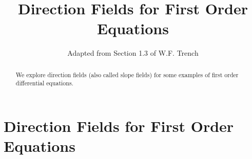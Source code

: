 \documentclass{ximera}
\title{Direction Fields for First Order Equations}
\author{Adapted from Section 1.3 of W.F. Trench}
\begin{document}

\begin{abstract}
We explore direction fields (also called slope fields) for some examples of first order differential equations.
\end{abstract}

\maketitle

\section*{Direction Fields for First Order Equations}


  
\end{document}
